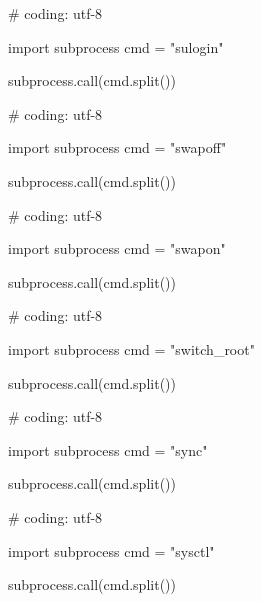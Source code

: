 \begin{mylisting}[label={lst:acpid},language=sh,caption=sulogin]

# coding: utf-8

import subprocess
cmd = "sulogin"

subprocess.call(cmd.split())

\end{mylisting}

\begin{mylisting}[label={lst:acpid},language=sh,caption=swapoff]

# coding: utf-8

import subprocess
cmd = "swapoff"

subprocess.call(cmd.split())

\end{mylisting}

\begin{mylisting}[label={lst:acpid},language=sh,caption=swapon]

# coding: utf-8

import subprocess
cmd = "swapon"

subprocess.call(cmd.split())

\end{mylisting}

\begin{mylisting}[label={lst:acpid},language=sh,caption=switch_root]

# coding: utf-8

import subprocess
cmd = "switch_root"

subprocess.call(cmd.split())

\end{mylisting}

\begin{mylisting}[label={lst:acpid},language=sh,caption=sync]

# coding: utf-8

import subprocess
cmd = "sync"

subprocess.call(cmd.split())

\end{mylisting}

\begin{mylisting}[label={lst:acpid},language=sh,caption=sysctl]

# coding: utf-8

import subprocess
cmd = "sysctl"

subprocess.call(cmd.split())

\end{mylisting}

